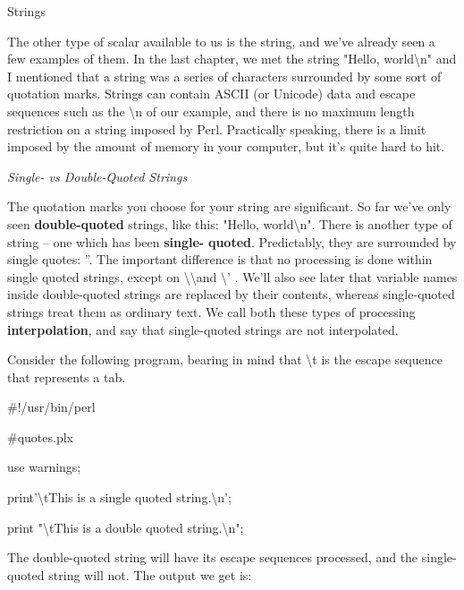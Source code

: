\documentclass[a4paper,11pt]{book}
\begin{document}
\noindent 

\noindent Strings

\noindent 

\noindent The other type of scalar available to us is the string, and we've already seen a few examples of them. In the last chapter, we met the string "Hello, world\textbackslash n" and I mentioned that a string was a series of characters surrounded by some sort of quotation marks. Strings can contain ASCII (or Unicode) data and escape sequences such as the \textbackslash n of our example, and there is no maximum length restriction on a string imposed by Perl. Practically speaking, there is a limit imposed by the amount of memory in your computer, but it's quite hard to hit.

\noindent 

\noindent \textit{Single- vs Double-Quoted Strings}

\noindent The quotation marks you choose for your string are significant. So far we've only seen \textbf{double-quoted} strings, like this: "Hello, world\textbackslash n". There is another type of string -- one which has been \textbf{single-} \textbf{quoted}. Predictably, they are surrounded by single quotes: ''. The important difference is that no processing is done within single quoted strings, except on \textbackslash \textbackslash  and \textbackslash ' . We'll also see later that variable names inside double-quoted strings are replaced by their contents, whereas single-quoted strings treat them as ordinary text. We call both these types of processing \textbf{interpolation}, and say that single-quoted strings are not interpolated.

\noindent 

\noindent 

\noindent Consider the following program, bearing in mind that \textbackslash t is the escape sequence that represents a tab.

\noindent 

\noindent \#!/usr/bin/perl

\noindent \#quotes.plx

\noindent use warnings;

\noindent print'\textbackslash tThis is a single quoted string.\textbackslash n';

\noindent print "\textbackslash tThis is a double quoted string.\textbackslash n";

\noindent 

\noindent The double-quoted string will have its escape sequences processed, and the single-quoted string will not. The output we get is:
\end{document}
